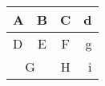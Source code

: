 \documentclass[a4paper]{article}
\begin{document}
\begin{center}
    \begin{tabular}[c]{|l|c|c|r|} 
    \hline
    A & B & C & d \\
    \hline
    D & E & F & g \\
    \hline
    \multicolumn{2}{|c|}{G} & H & i \\
    \hline
    \end{tabular}
\end{center}
\end{document}
